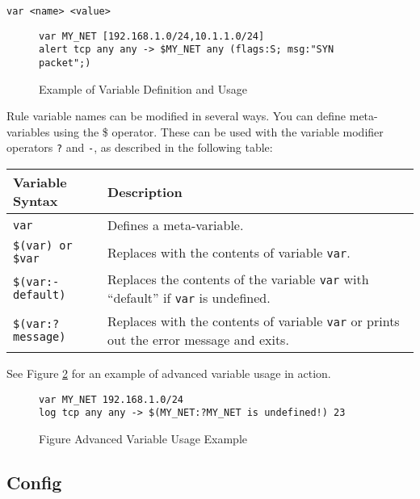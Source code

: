 \documentclass[english]{report}
\begin{document}
\begin{verbatim}
var <name> <value>
\end{verbatim}

\begin{figure}[!hbpt]
\begin{verbatim}
var MY_NET [192.168.1.0/24,10.1.1.0/24]
alert tcp any any -> $MY_NET any (flags:S; msg:"SYN packet";)
\end{verbatim}

\caption{Example of Variable Definition and Usage\label{variable definition}}
\end{figure}

Rule variable names can be modified in several ways. You can define
meta-variables using the \$ operator. These can be used with the variable
modifier operators {\tt ?}  and {\tt -}, as described in the following table: 

\begin{tabular}{| l | p{5in} |}
\hline
\textbf{Variable Syntax} & \textbf{Description}\\
\hline
\hline
\texttt{var} & Defines a meta-variable.\\
\hline
\texttt{\$(var) or \$var} & Replaces with the contents of variable \texttt{var}.\\
\hline
\texttt{\$(var:-default)} & Replaces the contents of the variable \texttt{var} with ``default'' if 
   \texttt{var} is undefined.\\
\hline
\texttt{\$(var:?message)} & Replaces with the contents of variable \texttt{var} or prints out the
error message and exits.\\
\hline
\end{tabular}


See Figure \ref{advanced variable usage} for an example of advanced variable usage in action.

\begin{figure}[!hbpt]
\begin{verbatim}
var MY_NET 192.168.1.0/24
log tcp any any -> $(MY_NET:?MY_NET is undefined!) 23
\end{verbatim}

\caption{Figure Advanced Variable Usage Example\label{advanced variable usage}}
\end{figure}

\subsection{Config\label{Config}}
\end{document}
